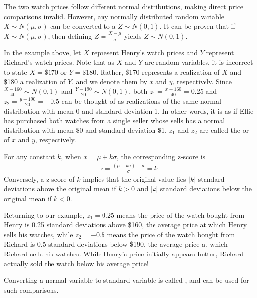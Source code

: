 The two watch prices follow different normal distributions, making direct price comparisons invalid.
However, any normally distributed random variable \( X \sim N(\mu, \sigma) \) can be converted to a  \( Z \sim N(0, 1) \).
It can be proven that if \( X \sim N(\mu, \sigma) \), then defining \( Z = \frac{X - \mu}{\sigma} \) yields \( Z \sim N(0, 1) \).

In the example above, let \( X \) represent Henry's watch prices and \( Y \) represent Richard's watch prices.
Note that as \( X \) and \( Y \) are random variables, it is incorrect to state \( X = \$170 \) or \( Y = \$180 \).
Rather, \$170 represents a realization of \( X \) and \$180 a realization of \( Y \), and we denote them by \( x \) and \( y \), respectively.
Since \( \frac{X - 160}{40} \sim N(0, 1) \) and \( \frac{Y - 190}{20} \sim N(0, 1) \), both \( z_1 = \frac{x - 160}{40} = 0.25 \) and \( z_2 = \frac{y - 190}{20} = -0.5 \) can be thought of as realizations of the same normal distribution with mean 0 and standard deviation 1.
In other words, it is as if Ellie has purchased both watches from a single seller whose sells has a normal distribution with mean \$0 and standard deviation \$1.
\( z_1 \) and \( z_2 \) are called the  or  of \( x \) and \( y \), respectively.

For any constant \( k \), when \( x = \mu + k\sigma \), the corresponding z-score is:
\begin{gather*}
    z = \frac{(\mu + k\sigma) - \mu}{\sigma} = k
\end{gather*}
Conversely, a z-score of \( k \) implies that the original value lies \( |k| \) standard deviations above the original mean if \( k > 0 \) and \( |k| \) standard deviations below the original mean if \( k < 0 \).

Returning to our example, \( z_1 = 0.25 \) means the price of the watch bought from Henry is 0.25 standard deviations above \$160, the average price at which Henry sells his watches,
while \( z_2 = -0.5 \) means the price of the watch bought from Richard is 0.5 standard deviations below \$190, the average price at which Richard sells his watches.
While Henry's price initially appears better, Richard actually sold the watch below his average price!

Converting a normal variable to standard variable is called , and can be used for such comparisons.


